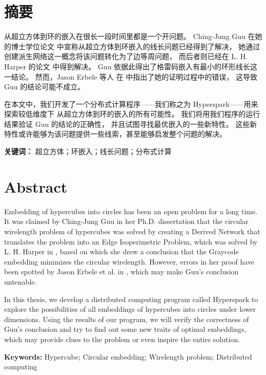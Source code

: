 
\chapter*{摘要}
\label{Abstract CN}

从超立方体到环的嵌入在很长一段时间里都是一个开问题。
Ching-Jung Guu 在她的博士学位论文 \cite{Guu.1997} 中宣称从超立方体到环嵌入的线长问题已经得到了解决，
她通过创建派生网络这一概念将该问题转化为了边等周问题，
而后者则已经在 L. H. Harper 的论文 \cite{Harper.1964} 中得到解决。
Guu 依据此得出了格雷码嵌入有最小的环形线长这一结论。
然而，Jason Erbele 等人 在 \cite{Erbele.2003} 中指出了她的证明过程中的错误，
这导致 Guu 的结论可能不成立。

在本文中，我们开发了一个分布式计算程序——我们称之为 Hyperspark——用来探索较低维度下
从超立方体到环的嵌入的所有可能性。
我们将用我们程序的运行结果验证 Guu 的结论的正确性，
并且试图寻找最优嵌入的一些新特性。
这些新特性或许能够为该问题提供一些线索，甚至能够启发整个问题的解决。
\hfill\break

\textbf{关键词：} 超立方体；环嵌入；线长问题；分布式计算

\chapter*{Abstract}
\label{Abstract EN}

Embedding of hypercubes into circles has been an open problem for a long time.
It was claimed by Ching-Jung Guu in her Ph.D. dissertation \cite{Guu.1997} that
the circular wirelength problem of hypercubes was solved by creating a Derived
Network that translates the problem into an Edge Isoperimetric Problem,
which was solved by L. H. Harper in \cite{Harper.1964}, based on which
she drew a conclusion that the Graycode embedding minimizes the circular wirelength.
However, errors in her proof have been spotted by Jason Erbele et al. in \cite{Erbele.2003},
which may make Guu's conclusion untenable.

In this thesis, we develop a distributed computing program called Hyperspark to
explore the possibilities of all embeddings of hypercubes into circles under lower dimensions.
Using the results of our program, we will verify the correctness of Guu's conclusion
and try to find out some new traits of optimal embeddings,
which may provide clues to the problem or even inspire the entire solution.
\hfill\break

\textbf{Keywords:} Hypercube; Circular embedding; Wirelength problem;
Distributed computing
